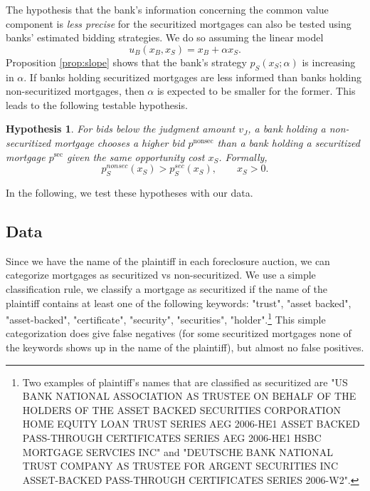 \documentclass[11pt,twopage]{article}
\newtheorem{conjecture}{Hypothesis}
{\bf}{\it}
\begin{document}
The hypothesis that the bank's information concerning the common value
component is \emph{less precise} for the securitized mortgages can
also be tested using banks' estimated bidding strategies. We do so
assuming the linear model
\[
u_B(x_B,x_S) = x_B+\alpha x_S .
\]
Proposition \ref{prop:slope} shows that the bank's strategy
$p_S(x_S;\alpha)$ is increasing in $\alpha$.  If banks holding
securitized mortgages are less informed than banks holding
non-securitized mortgages, then $\alpha$ is expected to be smaller for
the former. This leads to the following testable hypothesis.
%


\begin{conjecture}\label{hyp:slope}
  For bids below the judgment amount $v_J$, a bank holding a
  non-securitized mortgage chooses a higher bid $p^\text{nonsec}$ than
  a bank holding a securitized mortgage $p^\text{sec}$ given the same
  opportunity cost $x_S$. Formally, \[ p_S^{nonsec}(x_S) >
  p_S^{sec}(x_S), \quad\quad x_S>0 .\] \end{conjecture}

In the following, we test these hypotheses with our data.

%

\subsection{Data}

Since we have the name of the plaintiff in each foreclosure auction,
we can categorize mortgages as securitized vs non-securitized. We use
a simple classification rule, we classify a mortgage as securitized if
the name of the plaintiff contains at least one of the following
keywords: "trust", "asset backed", "asset-backed", "certificate",
"security", "securities", "holder".\footnote{Two examples of
  plaintiff's names that are classified as securitized are "US BANK
  NATIONAL ASSOCIATION AS TRUSTEE ON BEHALF OF THE HOLDERS OF THE
  ASSET BACKED SECURITIES CORPORATION HOME EQUITY LOAN TRUST SERIES
  AEG 2006-HE1 ASSET BACKED PASS-THROUGH CERTIFICATES SERIES AEG
  2006-HE1 HSBC MORTGAGE SERVCIES INC" and "DEUTSCHE BANK NATIONAL
  TRUST COMPANY AS TRUSTEE FOR ARGENT SECURITIES INC ASSET-BACKED
  PASS-THROUGH CERTIFICATES SERIES 2006-W2".} This simple
categorization does give false negatives (for some securitized
mortgages none of the keywords shows up in the name of the plaintiff),
but almost no false positives.
\end{document}
